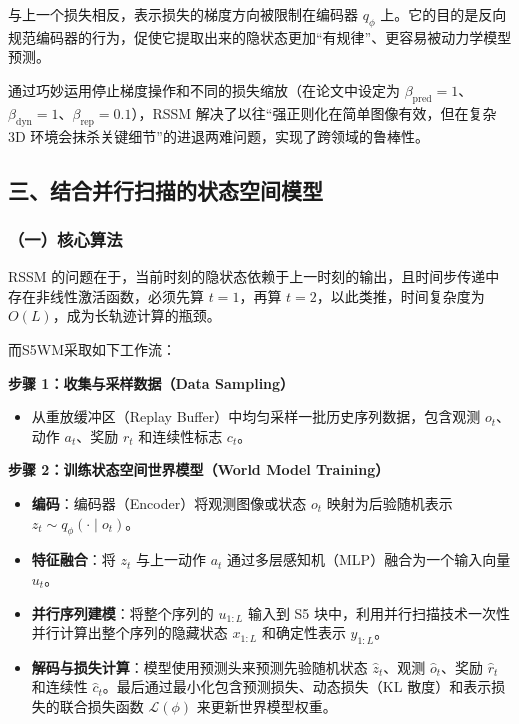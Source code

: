 与上一个损失相反，表示损失的梯度方向被限制在编码器 \(q_{\phi}\) 上。它的目的是反向规范编码器的行为，促使它提取出来的隐状态更加``有规律''、更容易被动力学模型预测。

通过巧妙运用停止梯度操作和不同的损失缩放（在论文中设定为 \(\beta_{\mathrm{pred}} = 1\)、\(\beta_{\mathrm{dyn}} = 1\)、\(\beta_{\mathrm{rep}} = 0.1\)），RSSM 解决了以往``强正则化在简单图像有效，但在复杂 3D 环境会抹杀关键细节''的进退两难问题，实现了跨领域的鲁棒性。

\hypertarget{ux4e09ux7ed3ux5408ux5e76ux884cux626bux63cfux7684ux72b6ux6001ux7a7aux95f4ux6a21ux578b}{%
\subsection{三、结合并行扫描的状态空间模型}\label{ux4e09ux7ed3ux5408ux5e76ux884cux626bux63cfux7684ux72b6ux6001ux7a7aux95f4ux6a21ux578b}}

\hypertarget{ux4e00ux6838ux5fc3ux7b97ux6cd5}{%
\subsubsection{（一）核心算法}\label{ux4e00ux6838ux5fc3ux7b97ux6cd5}}

RSSM 的问题在于，当前时刻的隐状态依赖于上一时刻的输出，且时间步传递中存在非线性激活函数，必须先算 \(t=1\)，再算 \(t=2\)，以此类推，时间复杂度为 \(O(L)\)，成为长轨迹计算的瓶颈。

而S5WM采取如下工作流：

\textbf{步骤 1：收集与采样数据（Data Sampling）}

\begin{itemize}
\tightlist
\item
  从重放缓冲区（Replay Buffer）中均匀采样一批历史序列数据，包含观测 \(o_t\)、动作 \(a_t\)、奖励 \(r_t\) 和连续性标志 \(c_t\)。
\end{itemize}

\textbf{步骤 2：训练状态空间世界模型（World Model Training）}

\begin{itemize}
\tightlist
\item
  \textbf{编码}：编码器（Encoder）将观测图像或状态 \(o_t\) 映射为后验随机表示 \(z_t \sim q_{\phi}(\cdot \mid o_t)\)。
\item
  \textbf{特征融合}：将 \(z_t\) 与上一动作 \(a_t\) 通过多层感知机（MLP）融合为一个输入向量 \(u_t\)。
\item
  \textbf{并行序列建模}：将整个序列的 \(u_{1:L}\) 输入到 S5 块中，利用并行扫描技术一次性并行计算出整个序列的隐藏状态 \(x_{1:L}\) 和确定性表示 \(y_{1:L}\)。
\item
  \textbf{解码与损失计算}：模型使用预测头来预测先验随机状态 \(\hat{z}_t\)、观测 \(\hat{o}_t\)、奖励 \(\hat{r}_t\) 和连续性 \(\hat{c}_t\)。最后通过最小化包含预测损失、动态损失（KL 散度）和表示损失的联合损失函数 \(\mathcal{L}(\phi)\) 来更新世界模型权重。
\end{itemize}

